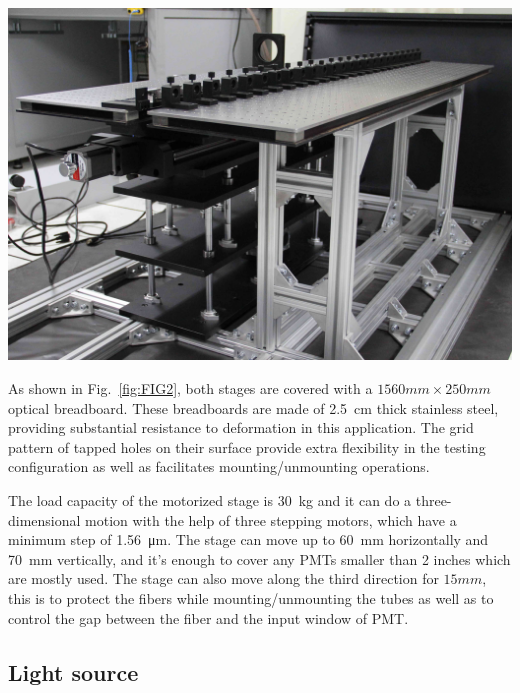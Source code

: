\documentclass[a4paper,10pt,twoside]{cpc-hepnp}
\begin{document}
\begin{CJK*}{UTF8}{gbsn}
\begin{multicols}{2}
\begin{center}
	\includegraphics[width=\linewidth]{FIG2}
\end{center} 

As shown in Fig.~\ref{fig:FIG2}, both stages are covered with a $1560mm\times250mm$ optical breadboard. 
These breadboards are made of \SI{2.5}{cm} thick stainless steel, providing substantial resistance to deformation in this application. 
The grid pattern of tapped holes on their surface provide extra flexibility in the testing configuration as well as facilitates mounting/unmounting operations.

The load capacity of the motorized stage is \SI{30}{\kilo\gram} and it can do a three-dimensional motion with the help of three stepping motors, which have a minimum step of \SI{1.56}{\micro\meter}.
The stage can move up to \SI{60}{\milli\meter} horizontally and \SI{70}{\milli\meter} vertically, and it's enough to cover any PMTs smaller than 2 inches which are mostly used.
The stage can also move along the third direction for $15mm$, this is to protect the fibers while mounting/unmounting the tubes as well as to control the gap between the fiber and the input window of PMT.

\subsection{Light source}
\label{sec:light_source}


\end{multicols}
\end{CJK*}
\end{document}
